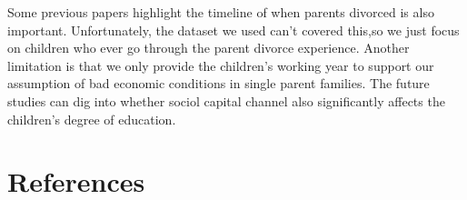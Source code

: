 \documentclass[]{AEA}
\begin{document}
    Some previous papers highlight the timeline of when parents divorced is also important. Unfortunately, the dataset we used can't covered this,so we just focus on children who ever go through the parent divorce experience. Another limitation is that we only provide the children's working year to support our assumption of bad economic conditions in single parent families. The future studies can dig into whether sociol capital channel also significantly affects the children's degree of education.



\section*{References}



\end{document}
